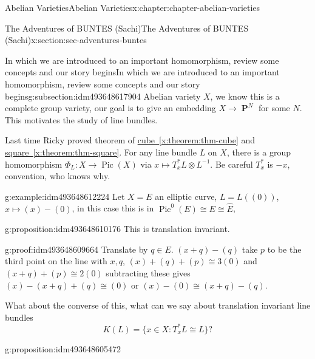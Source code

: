 \documentclass[oneside,10pt,]{book}
\numberwithin{equation}{section}
\DeclareMathOperator{\Pic}{Pic}
\DeclareMathOperator{\PP}{\mathbf{P}}
\begin{document}
\begin{chapterptx}{Abelian Varieties}{}{Abelian Varieties}{}{}{x:chapter:chapter-abelian-varieties}
\typeout{************************************************}
%
\begin{sectionptx}{The Adventures of BUNTES (Sachi)}{}{The Adventures of BUNTES (Sachi)}{}{}{x:section:sec-adventures-buntes}
%
%
\typeout{************************************************}
\typeout{************************************************}
%
\begin{subsectionptx}{In which we are introduced to an important homomorphism, review some concepts and our story begins}{}{In which we are introduced to an important homomorphism, review some concepts and our story begins}{}{}{g:subsection:idm493648617904}
Abelian variety  \(X\), we know this is a complete group variety, our goal is to give an embedding \(X\to \PP^N\) for some \(N\). This motivates the study of line bundles.%
\par
Last time Ricky proved theorem of \hyperref[x:theorem:thm-cube]{cube~\ref{x:theorem:thm-cube}} and \hyperref[x:theorem:thm-square]{square~\ref{x:theorem:thm-square}}. For any line bundle  \(L\) on \(X\), there is a group homomorphism \(\Phi_L\colon X \to \Pic(X)\) via \(x\mapsto T_x^* L\otimes L^{-1}\). Be careful \(T_x^*\) is \(-x\), convention, who knows why.%
\begin{example}{}{g:example:idm493648612224}%
Let \(X =E\) an elliptic curve, \(L = L((0))\), \(x\mapsto (x) - (0)\), in this case this is in \(\Pic^0(E) \cong E \cong \widehat E\),%
\end{example}
\begin{proposition}{}{}{g:proposition:idm493648610176}%
This is translation invariant.%
\end{proposition}
\begin{proofptx}{}{g:proof:idm493648609664}
Translate by \(q\in E\). \((x+q) - (q)\) take \(p\) to be the third point on the line with \(x,q\), \((x) + (q) + (p) \cong 3(0)\) and \((x+q) + (p) \cong 2 (0)\) subtracting these gives \((x) - (x+q) +(q) \cong (0)\) or \((x) - (0) \cong (x+q) -(q)\).%
\end{proofptx}
What about the converse of this, what can we say about translation invariant line bundles%
\begin{equation*}
K(L) = \{x\in X : T_x^* L \cong L\}\text{?}
\end{equation*}
%
\begin{proposition}{}{}{g:proposition:idm493648605472}%

\end{proposition}
\end{subsectionptx}
\end{sectionptx}
\end{chapterptx}
\end{document}
